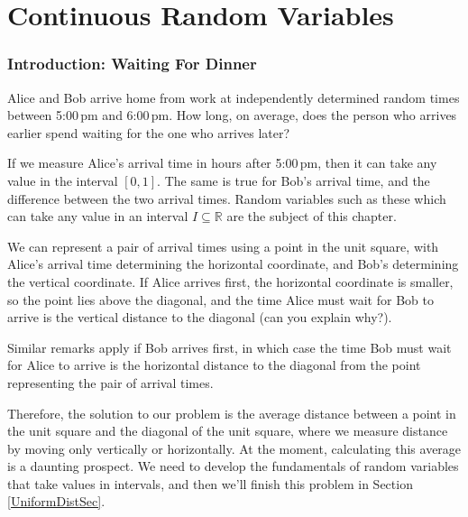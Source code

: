 \pagestyle{headings}
\chapter{Continuous Random Variables} \label{chp 4}
\thispagestyle{fancy}

\subsection*{Introduction: Waiting For Dinner}
Alice and Bob arrive home from work at independently determined random times between 5:00\,pm and 6:00\,pm. How long, on average, does the person who arrives earlier spend waiting for the one who arrives later?
\par
If we measure Alice's arrival time in hours after 5:00\,pm, then it can take any value in the interval $[0,1]$. The same is true for Bob's arrival time, and the difference between the two arrival times. Random variables such as these which can take any value in an interval $I \subseteq \mathbb{R}$ are the subject of this chapter.
\par
We can represent a pair of arrival times using a point in the unit square, with Alice's arrival time determining the horizontal coordinate, and Bob's determining the vertical coordinate. If Alice arrives first, the horizontal coordinate is smaller, so the point lies above the diagonal, and the time Alice must wait for Bob to arrive is the vertical distance to the diagonal (can you explain why?).
\begin{center}
\end{center}
Similar remarks apply if Bob arrives first, in which case the time Bob must wait for Alice to arrive is the horizontal distance to the diagonal from the point representing the pair of arrival times.
\par
Therefore, the solution to our problem is the average distance between a point in the unit square and the diagonal of the unit square, where we measure distance by moving only vertically or horizontally. At the moment, calculating this average is a daunting prospect. We need to develop the fundamentals of random variables that take values in intervals, and then we'll finish this problem in Section \ref{UniformDistSec}. 

